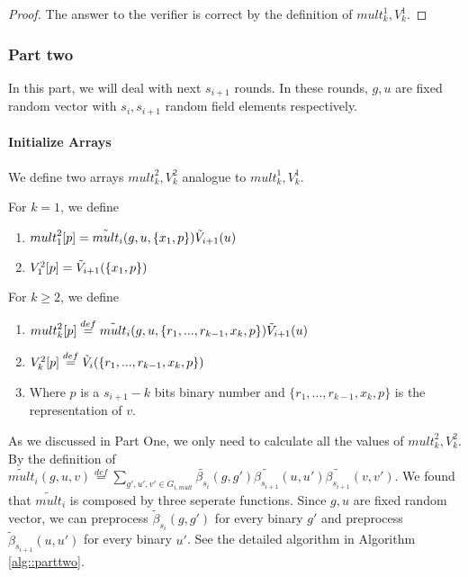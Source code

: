 {\begin{proof}
		The answer to the verifier is correct by the definition of ${mult}_k^1, {V}_k^1$.
	\end{proof}
	
	\subsubsection{Part two}
	In this part, we will deal with next $s_{i+1}$ rounds. In these rounds, $g, u$ are fixed random vector with $s_{i}, s_{i+1}$ random field elements respectively.
	
	\paragraph*{Initialize Arrays}
	We define two arrays ${mult}_k^2, {V}_k^2$ analogue to ${mult}_k^1, {V}_k^1$.
	
	\begin{definition}
		For $k=1$, we define 
		\begin{enumerate}
			\item ${mult}_1^2[p] = \tilde{mult}_i(g, u, \{x_1, p\})\tilde{V}_{i+1}(u)$
			\item ${V}_1^2[p] = \tilde{V}_{i+1}(\{x_1, p\})$
		\end{enumerate}
		For $k\ge 2$, we define
		\begin{enumerate}
			\item ${mult}_k^2[p]\overset{def}{=}\tilde{mult}_i(g, u, \{r_1, ..., r_{k-1}, x_k, p\})\tilde{V}_{i+1}(u)$
			\item ${V}_k^2[p]\overset{def}{=}\tilde{V}_i(\{r_1, ..., r_{k-1}, x_k, p\})$
			\item Where $p$ is a $s_{i+1}-k$ bits binary number and $\{r_1, ..., r_{k-1}, x_k, p\}$ is the representation of $v$.
		\end{enumerate}
	\end{definition}
	
	As we discussed in Part One, we only need to calculate all the values of ${mult}_k^2, {V}_k^2$. By the definition of $\tilde{mult}_i(g, u, v)\overset{def}{=}\sum_{g', u', v' \in G_{i, mult}}\tilde{\beta_{s_i}}(g, g')\tilde{\beta_{s_{i+1}}}(u, u')\tilde{\beta_{s_{i+1}}}(v, v')$. We found that $\tilde{mult}_i$ is composed by three seperate functions. Since $g, u$ are fixed random vector, we can preprocess $\tilde{\beta}_{s_i}(g, g')$ for every binary $g'$ and preprocess $\tilde{\beta}_{s_{i+1}}(u, u')$ for every binary $u'$. See the detailed algorithm in Algorithm \ref{alg::parttwo}.
	
}
